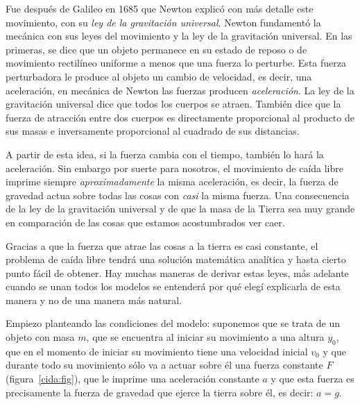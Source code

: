 Fue después de Galileo en 1685 que Newton explicó con más detalle este movimiento, con su \emph{ley de la gravitación universal}.
Newton fundamentó la mecánica con sus leyes del movimiento y la ley de la gravitación universal.
En las primeras, se dice que un objeto permanece en su estado de reposo o de movimiento rectilíneo uniforme a menos que una fuerza lo perturbe.
Esta fuerza perturbadora le produce al objeto un cambio de velocidad, es decir, una aceleración, en mecánica de Newton las fuerzas producen \emph{aceleración}.
La ley de la gravitación universal dice que todos los cuerpos se atraen.
También dice que la fuerza de atracción entre dos cuerpos es directamente proporcional al producto de sus masas e inversamente proporcional al cuadrado de sus distancias.

A partir de esta idea, si la fuerza cambia con el tiempo, también lo hará la aceleración.
Sin embargo por suerte para nosotros, el movimiento de caída libre imprime siempre \emph{aproximadamente} la misma aceleración, es decir, la fuerza de gravedad actua sobre todas las cosas con \emph{casi} la misma fuerza.
Una consecuencia de la ley de la gravitación universal y de que la masa de la Tierra sea muy grande en comparación de las cosas que estamos acostumbrados ver caer.

Gracias a que la fuerza que atrae las cosas a la tierra es casi constante, el problema de caída libre tendrá una solución matemática analítica y hasta cierto punto fácil de obtener.
Hay muchas maneras de derivar estas leyes, más adelante cuando se unan todos los modelos se entenderá por qué elegí explicarla de esta manera y no de una manera más natural.

Empiezo planteando las condiciones del modelo: suponemos que se trata de un objeto con masa $m$, que se encuentra al iniciar su movimiento a una altura $y_0$, que en el momento de iniciar su movimiento tiene una velocidad inicial $v_0$ y que durante todo su movimiento sólo va a actuar sobre él una fuerza constante $F$ (figura~\ref{cida:fig}), que le imprime una aceleración constante $a$ y que esta fuerza es precisamente la fuerza de gravedad que ejerce la tierra sobre él, es decir: $a = g$.

